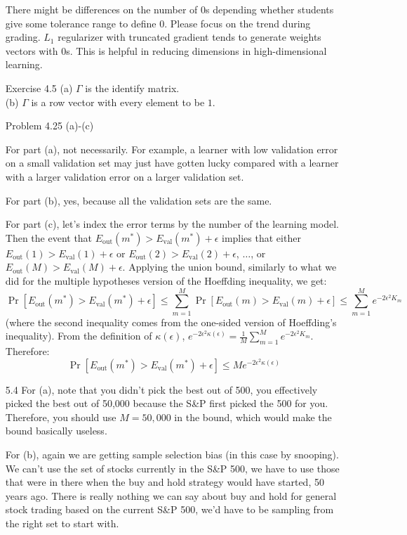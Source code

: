 \documentclass[10pt]{article}
\newcommand{\out}{\text{out}}
\newcommand{\val}{\text{val}}
\begin{document}
\begin{enumerate}
  There might be differences on the number of 0s depending whether students give some tolerance range to define 0. Please focus on the trend during grading.
  $L_1$ regularizer with truncated gradient tends to generate weights vectors with 0s. 
  This is helpful in reducing dimensions in high-dimensional learning.

\item[Exercise 4.5] 
(a) $\Gamma$ is the identify matrix.\\
(b) $\Gamma$ is a row vector with every element to be $1$.


\item[Problem 4.25 (a)-(c)]

For part (a), not necessarily. For example, a learner with low
validation error on a small validation set may just have gotten lucky
compared with a learner with a larger validation error on a larger
validation set.

For part (b), yes, because all the validation sets are the same. 

For part (c), let's index the error terms by the number of the
learning model. Then the event that $E_{\out}(m^*) > E_{\val}(m^*) +
\epsilon$ implies that either $E_{\out}(1) > E_{\val}(1) + \epsilon$
or $E_{\out}(2) > E_{\val}(2) + \epsilon$, $\ldots$, or $E_{\out}(M) >
E_{\val}(M) + \epsilon$. Applying the union bound, similarly to what
we did for the multiple hypotheses version of the Hoeffding
inequality, we get:
\[ \Pr [E_{\out}(m^*) > E_{\val}(m^*) + \epsilon] \leq \sum_{m=1}^{M}
\Pr [E_{\out}(m) > E_{\val}(m) + \epsilon] \leq \sum_{m=1}^{M} e^{-2
  \epsilon^2 K_m} \]
(where the second inequality comes from the one-sided version of
Hoeffding's inequality). From the definition of $\kappa (\epsilon)$,
$e^{-2 \epsilon^2 \kappa(\epsilon)} = \frac{1}{M} \sum_{m=1}^{M} e^{-2
  \epsilon^2 K_m}$. Therefore:
\[ \Pr [E_{\out}(m^*) > E_{\val}(m^*) + \epsilon] \leq M e^{-2
  \epsilon^2 \kappa(\epsilon)} \]

     
\item[5.4]
For (a), note that you didn't pick the best out of 500, you
effectively picked the best out of 50,000 because the S\&P first picked
the 500 for you. Therefore, you should use $M=50,000$ in the bound,
which would make the bound basically useless.

For (b), again we are getting sample selection bias (in this case by
snooping). We can't use the set of stocks currently in the S\&P 500,
we have to use those that were in there when the buy and hold strategy
would have started, 50 years ago. There is really nothing we can say
about buy and hold for general stock trading based on the current S\&P
500, we'd have to be sampling from the right set to start with.



\end{enumerate}
\end{document}
